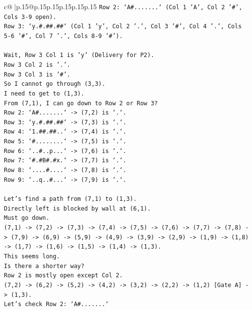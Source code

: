 \documentclass{article}
\begin{document}
{\begin{supertabular}{c@{$\;$}|p{.15\linewidth}@{}p{.15\linewidth}p{.15\linewidth}p{.15\linewidth}p{.15\linewidth}p{.15\linewidth}}
{{{\texttt{Row 2: `A\#.......` (Col 1 'A', Col 2 '\#', Cols 3{-}9 open).} \\
\texttt{Row 3: `y.\#.\#\#.\#\#` (Col 1 'y', Col 2 '.', Col 3 '\#', Col 4 '.', Cols 5{-}6 '\#', Col 7 '.', Cols 8{-}9 '\#').} \\
\\ 
\texttt{Wait, Row 3 Col 1 is 'y' (Delivery for P2).} \\
\texttt{Row 3 Col 2 is '.'.} \\
\texttt{Row 3 Col 3 is '\#'.} \\
\texttt{So I cannot go through (3,3).} \\
\texttt{I need to get to (1,3).} \\
\texttt{From (7,1), I can go down to Row 2 or Row 3?} \\
\texttt{Row 2: `A\#.......` {-}> (7,2) is `.`.} \\
\texttt{Row 3: `y.\#.\#\#.\#\#` {-}> (7,3) is `.`.} \\
\texttt{Row 4: `1.\#\#.\#\#..` {-}> (7,4) is `.`.} \\
\texttt{Row 5: `\#........` {-}> (7,5) is `.`.} \\
\texttt{Row 6: `..\#..p...` {-}> (7,6) is `.`.} \\
\texttt{Row 7: `\#.\#B\#.\#x.` {-}> (7,7) is `.`.} \\
\texttt{Row 8: `....\#....` {-}> (7,8) is `.`.} \\
\texttt{Row 9: `..q..\#...` {-}> (7,9) is `.`.} \\
\\ 
\texttt{Let's find a path from (7,1) to (1,3).} \\
\texttt{Directly left is blocked by wall at (6,1).} \\
\texttt{Must go down.} \\
\texttt{(7,1) {-}> (7,2) {-}> (7,3) {-}> (7,4) {-}> (7,5) {-}> (7,6) {-}> (7,7) {-}> (7,8) {-}> (7,9) {-}> (6,9) {-}> (5,9) {-}> (4,9) {-}> (3,9) {-}> (2,9) {-}> (1,9) {-}> (1,8) {-}> (1,7) {-}> (1,6) {-}> (1,5) {-}> (1,4) {-}> (1,3).} \\
\texttt{This seems long.} \\
\texttt{Is there a shorter way?} \\
\texttt{Row 2 is mostly open except Col 2.} \\
\texttt{(7,2) {-}> (6,2) {-}> (5,2) {-}> (4,2) {-}> (3,2) {-}> (2,2) {-}> (1,2) {[}Gate A{]} {-}> (1,3).} \\
\texttt{Let's check Row 2: `A\#.......`} \\
}}}
\end{supertabular}}
\end{document}
